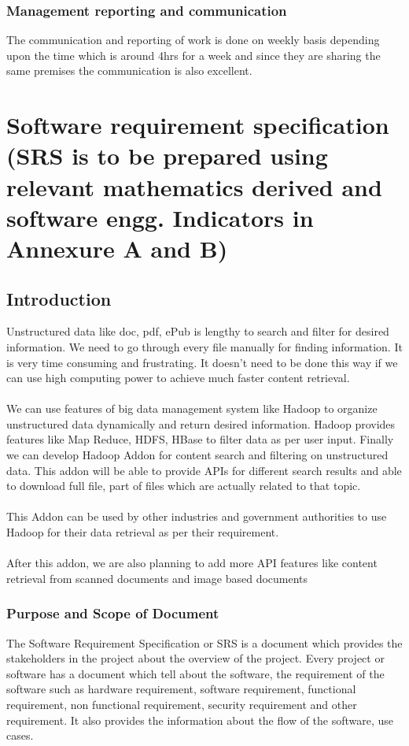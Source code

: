 \documentclass[oneside,a4paper,12pt]{report}
\begin{document}
\subsection{Management reporting and communication}
The communication and reporting of work is done on weekly basis depending upon the time which is around 4hrs for a week and since they are sharing the same premises the communication is also excellent.
 
\chapter{Software requirement specification  (SRS is to be prepared using relevant mathematics derived and software engg. Indicators in Annexure A and B)}

\section{Introduction}
Unstructured data like doc, pdf, ePub is lengthy to search and filter for desired information. We need to go through every file manually for finding information. It is very time consuming and frustrating. It doesn’t need to be done this way if we can use high computing power to achieve much faster content retrieval.\\\\
We can use features of big data management system like Hadoop to organize unstructured data dynamically and return desired information. Hadoop provides features like Map Reduce, HDFS, HBase to filter data as per user input. Finally we can develop Hadoop Addon for content search and filtering on unstructured data. This addon will be able to provide APIs for different search results and able to download full file, part of files which are actually related to that topic.\\\\
This Addon can be used by other industries and government authorities to use Hadoop for their data retrieval as per their requirement.\\\\
After this addon, we are also planning to add more API features like content retrieval from scanned documents and image based documents

\subsection{Purpose and Scope of Document}
The Software Requirement Specification or SRS is a document which provides the stakeholders in the project about the overview of the project. Every project or software has a document which tell about the software, the requirement of the software such as hardware requirement, software requirement, functional requirement, non functional requirement, security requirement and other requirement. It also provides the information about the flow of the software, use cases. \\
\end{document}
